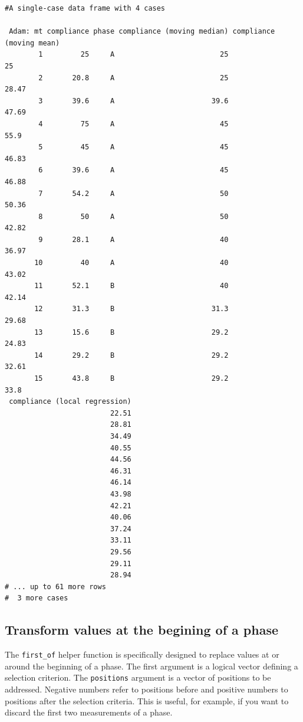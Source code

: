 \documentclass[
  letterpaper,
  DIV=11,
  numbers=noendperiod]{scrreprt}
\begin{document}
\begin{verbatim}
#A single-case data frame with 4 cases

 Adam: mt compliance phase compliance (moving median) compliance (moving mean)
        1         25     A                         25                       25
        2       20.8     A                         25                    28.47
        3       39.6     A                       39.6                    47.69
        4         75     A                         45                     55.9
        5         45     A                         45                    46.83
        6       39.6     A                         45                    46.88
        7       54.2     A                         50                    50.36
        8         50     A                         50                    42.82
        9       28.1     A                         40                    36.97
       10         40     A                         40                    43.02
       11       52.1     B                         40                    42.14
       12       31.3     B                       31.3                    29.68
       13       15.6     B                       29.2                    24.83
       14       29.2     B                       29.2                    32.61
       15       43.8     B                       29.2                     33.8
 compliance (local regression)
                         22.51
                         28.81
                         34.49
                         40.55
                         44.56
                         46.31
                         46.14
                         43.98
                         42.21
                         40.06
                         37.24
                         33.11
                         29.56
                         29.11
                         28.94
# ... up to 61 more rows
#  3 more cases
\end{verbatim}

\hypertarget{transform-values-at-the-begining-of-a-phase}{%
\subsection{Transform values at the begining of a
phase}\label{transform-values-at-the-begining-of-a-phase}}

The \texttt{first\_of} helper function is specifically designed to
replace values at or around the beginning of a phase. The first argument
is a logical vector defining a selection criterion. The
\texttt{positions} argument is a vector of positions to be addressed.
Negative numbers refer to positions before and positive numbers to
positions after the selection criteria. This is useful, for example, if
you want to discard the first two measurements of a phase.
\end{document}
